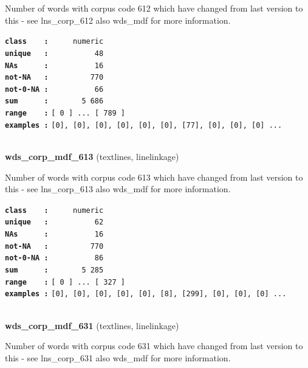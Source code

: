 \documentclass[]{article}
\begin{document}
Number of words with corpus code 612 which have changed from last
version to this - see lns\_corp\_612 also wds\_mdf for more information.

\textbf{\texttt{class\ \ \ \ :}} \texttt{~~~~~numeric}\\
\textbf{\texttt{unique\ \ \ :}} \texttt{~~~~~~~~~~48}\\
\textbf{\texttt{NAs\ \ \ \ \ \ :}} \texttt{~~~~~~~~~~16}\\
\textbf{\texttt{not-NA\ \ \ :}} \texttt{~~~~~~~~~770}\\
\textbf{\texttt{not-0-NA\ :}} \texttt{~~~~~~~~~~66}\\
\textbf{\texttt{sum\ \ \ \ \ \ :}} \texttt{~~~~~~~5~686}\\
\textbf{\texttt{range\ \ \ \ :}}
\texttt{{[}\ 0\ {]}\ ...\ {[}\ 789\ {]}}\\
\textbf{\texttt{examples\ :}}
\texttt{{[}0{]},\ {[}0{]},\ {[}0{]},\ {[}0{]},\ {[}0{]},\ {[}0{]},\ {[}77{]},\ {[}0{]},\ {[}0{]},\ {[}0{]}\ ...}\\

~

\textbf{wds\_corp\_mdf\_613} (textlines, linelinkage)

Number of words with corpus code 613 which have changed from last
version to this - see lns\_corp\_613 also wds\_mdf for more information.

\textbf{\texttt{class\ \ \ \ :}} \texttt{~~~~~numeric}\\
\textbf{\texttt{unique\ \ \ :}} \texttt{~~~~~~~~~~62}\\
\textbf{\texttt{NAs\ \ \ \ \ \ :}} \texttt{~~~~~~~~~~16}\\
\textbf{\texttt{not-NA\ \ \ :}} \texttt{~~~~~~~~~770}\\
\textbf{\texttt{not-0-NA\ :}} \texttt{~~~~~~~~~~86}\\
\textbf{\texttt{sum\ \ \ \ \ \ :}} \texttt{~~~~~~~5~285}\\
\textbf{\texttt{range\ \ \ \ :}}
\texttt{{[}\ 0\ {]}\ ...\ {[}\ 327\ {]}}\\
\textbf{\texttt{examples\ :}}
\texttt{{[}0{]},\ {[}0{]},\ {[}0{]},\ {[}0{]},\ {[}0{]},\ {[}8{]},\ {[}299{]},\ {[}0{]},\ {[}0{]},\ {[}0{]}\ ...}\\

~

\textbf{wds\_corp\_mdf\_631} (textlines, linelinkage)

Number of words with corpus code 631 which have changed from last
version to this - see lns\_corp\_631 also wds\_mdf for more information.
\end{document}
